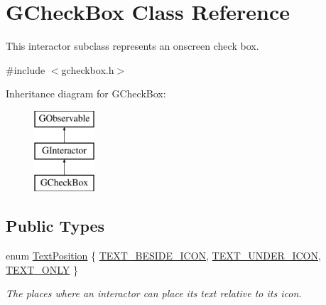 \hypertarget{classGCheckBox}{}\section{G\+Check\+Box Class Reference}
\label{classGCheckBox}


This interactor subclass represents an onscreen check box.  




{\ttfamily \#include $<$gcheckbox.\+h$>$}

Inheritance diagram for G\+Check\+Box\+:\begin{figure}[H]
\begin{center}
\leavevmode
\includegraphics[height=3.000000cm]{classGCheckBox}
\end{center}
\end{figure}
\subsection*{Public Types}
\begin{DoxyCompactItemize}
\item 
enum \mbox{\hyperlink{classGInteractor_a8e0d441725a81d2bbdebbea09078260e}{Text\+Position}} \{ \mbox{\hyperlink{classGInteractor_a8e0d441725a81d2bbdebbea09078260ea4cd6f2e7d5a08d6f4dc052df2358f774}{T\+E\+X\+T\+\_\+\+B\+E\+S\+I\+D\+E\+\_\+\+I\+C\+ON}}, 
\mbox{\hyperlink{classGInteractor_a8e0d441725a81d2bbdebbea09078260eaa88490f63d8de68d44c83bdb2ecde3b3}{T\+E\+X\+T\+\_\+\+U\+N\+D\+E\+R\+\_\+\+I\+C\+ON}}, 
\mbox{\hyperlink{classGInteractor_a8e0d441725a81d2bbdebbea09078260ea39a6f388a30ac4fefb6eb13e846bc9f2}{T\+E\+X\+T\+\_\+\+O\+N\+LY}}
 \}
\begin{DoxyCompactList}\small\item\em The places where an interactor can place its text relative to its icon. \end{DoxyCompactList}\end{DoxyCompactItemize}

